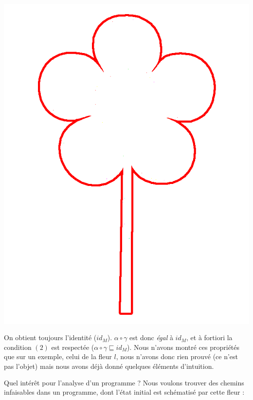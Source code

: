 \documentclass[french]{article}
\begin{document}
  \begin{center}
    \includegraphics[scale=0.19]{pictures/flower4.png}
  \end{center}
  
  On obtient toujours l'identité ($id_M$). $\alpha \circ \gamma$ est donc \textit{égal} à $id_M$, et à fortiori la condition $(2)$ est respectée ($\alpha \circ \gamma \sqsubseteq id_M$). Nous n'avons montré ces propriétés que sur un exemple, celui de la fleur $l$, nous n'avons donc rien prouvé (ce n'est pas l'objet) mais nous avons déjà donné quelques éléments d'intuition.
  
  Quel intérêt pour l'analyse d'un programme ? Nous voulons trouver des chemins infaisables dans un programme, dont l'état initial est schématisé par cette fleur :
  
\end{document}
